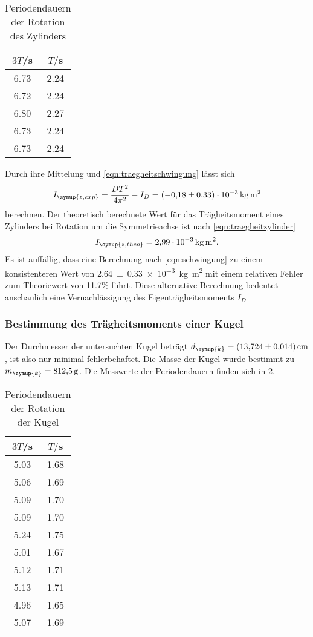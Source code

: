 \begin{table}
\centering
\caption{Periodendauern der Rotation des Zylinders}
\label{tab:zylinder}
\begin{tabular}{c c}
\toprule
$3T$/s & $T/$s \\
\midrule
6.73 & 2.24 \\
6.72 & 2.24 \\
6.80 & 2.27 \\
6.73 & 2.24 \\
6.73 & 2.24 \\
\bottomrule
\end{tabular}
\end{table}

Durch ihre Mittelung und \eqref{eqn:traegheitschwingung} lässt sich
\begin{equation}
  I_{\symup{z,exp}} = \frac{DT^2}{4\pi^2}-I_D = \SI{-0.18(033)e-3}{\kilogram\meter\squared}
\end{equation}
berechnen. Der theoretisch berechnete Wert für das Trägheitsmoment eines Zylinders
bei Rotation um die Symmetrieachse ist nach \eqref{eqn:traegheitzylinder}
\begin{equation}
  I_{\symup{z,theo}} = \SI{2.99e-3}{\kilogram\meter\squared}.
\end{equation}
Es ist auffällig, dass eine Berechnung nach \eqref{eqn:schwingung} zu einem
konsistenteren Wert von \SI{2.64(033)e-3}{\kilogram\meter\squared} mit einem
relativen Fehler zum Theoriewert von 11.7\% führt. Diese alternative Berechnung
bedeutet anschaulich eine Vernachlässigung des Eigenträgheitsmoments $I_D$

\subsubsection{Bestimmung des Trägheitsmoments einer Kugel}
Der Durchmesser der untersuchten Kugel beträgt $d_{\symup{k}}=\SI{13.724(0014)}{\cm}$,
ist also nur minimal fehlerbehaftet. Die Masse der Kugel wurde bestimmt zu
$m_{\symup{k}}=\SI{812.5}{\gram}$. Die Messwerte der Periodendauern finden sich
in \ref{tab:kugel}.

\begin{table}
\centering
\caption{Periodendauern der Rotation der Kugel}
\label{tab:kugel}
\begin{tabular}{c c}
\toprule
$3T$/s & $T/$s \\
\midrule
5.03 & 1.68 \\
5.06 & 1.69 \\
5.09 & 1.70 \\
5.09 & 1.70 \\
5.24 & 1.75 \\
5.01 & 1.67 \\
5.12 & 1.71 \\
5.13 & 1.71 \\
4.96 & 1.65 \\
5.07 & 1.69 \\
\bottomrule
\end{tabular}
\end{table}

